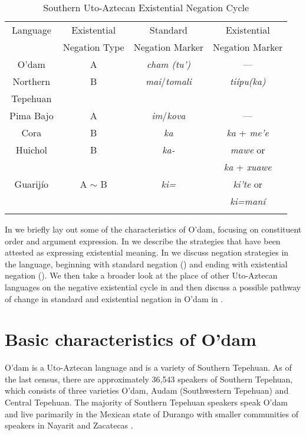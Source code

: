 \documentclass[output=paper]{langsci/langscibook}
\begin{document}
\begin{table}
\caption{Southern Uto-Aztecan Existential Negation Cycle}
\label{tab:odam-suaexcyc}
\begin{tabular}{ c c c c }
     \lsptoprule
     Language & Existential & Standard & Existential \\
     &  Negation Type &   Negation Marker &   Negation Marker\\
     \midrule
 O'dam    & A   &   \emph{ cham (tu')}    &  --- \\
 \midrule
 Northern & B & \emph{mai}/\emph{tomali} & \emph {ti\'ipu(ka)} \\
 Tepehuan   &   &   &\\
 \midrule
 Pima Bajo & A  &   \emph{im}/\emph{kova} & --- \\
 \midrule
 Cora & B   &   \emph{ka}    &   \emph{ka} + \emph{me'e}\\
 \midrule
 Huichol & B    & \emph{ka-}    &   \emph{mawe} or \\
 & & & \emph{ka} + \emph{xuawe}\\
 \midrule
 Guarij\'io & A $\sim$ B &   \emph{ki=}  &   \emph{ki'te} or \\
    &   &   &   \emph{ki=maní}\\
 \lspbottomrule
\end{tabular}
\end{table}

In  we briefly lay out some of the characteristics of O’dam, focusing on constituent order and argument expression. In  we describe the strategies that have been attested as expressing existential meaning. In  we discuss negation strategies in the language, beginning with standard negation () and ending with existential negation (). We then take a broader look at the place of other Uto-Aztecan languages on the negative existential cycle in  and then discuss a possible pathway of change in standard and existential negation in O'dam in .

\section{Basic characteristics of O’dam}
\label{sec:odam-basicchar}
O'dam is a Uto-Aztecan language and is a variety of Southern Tepehuan.
As of the last census, there are  approximately 36,543 speakers of Southern Tepehuan, which consists of three varieties O'dam, Audam (Southwestern Tepehuan) and Central Tepehuan. The majority of Southern Tepehuan speakers speak O'dam and live parimarily in the Mexican state of Durango with smaller communities of speakers in Nayarit and Zacatecas \citep{inegi2010}.
\end{document}

